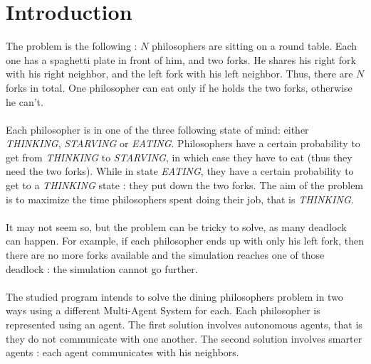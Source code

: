 \section{Introduction}
The problem is the following : $N$ philosophers are sitting on a round table. Each one has a spaghetti plate in front of him, and two forks. He shares his right fork with his right neighbor, and the left fork with his left neighbor. Thus, there are $N$ forks in total. One philosopher can eat only if he holds the two forks, otherwise he can't. \\
\\
Each philosopher is in one of the three following state of mind: either \textit{THINKING}, \textit{STARVING} or \textit{EATING}. Philosophers have a certain probability to get from \textit{THINKING} to \textit{STARVING}, in which case they have to eat (thus they need the two forks). While in state \textit{EATING}, they have a certain probability to get to a \textit{THINKING} state : they put down the two forks. The aim of the problem is to maximize the time philosophers spent doing their job, that is \textit{THINKING}.\\
\\
It may not seem so, but the problem can be tricky to solve, as many deadlock can happen. For example, if each philosopher ends up with only his left fork, then there are no more forks available and the simulation reaches one of those deadlock : the simulation cannot go further. \\
\\
The studied program intends to solve the dining philosophers problem in two ways using a different Multi-Agent System for each. Each philosopher is represented using an agent. The first solution involves autonomous agents, that is they do not communicate with one another. The second solution involves smarter agents : each agent communicates with his neighbors.

